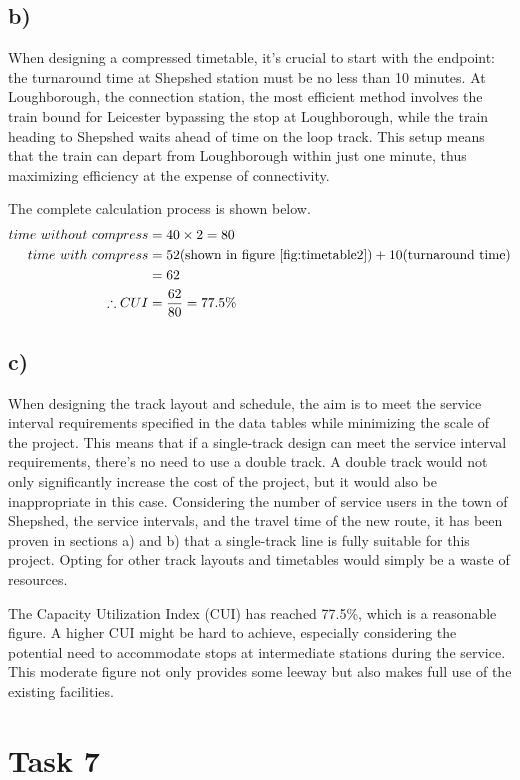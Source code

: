 \documentclass[letterpaper,12pt,leqno]{article}
\begin{document}
\subsection{b)}
When designing a compressed timetable, it's crucial to start with the endpoint: the turnaround time at Shepshed station must be no less than 10 minutes. At Loughborough, the connection station, the most efficient method involves the train bound for Leicester bypassing the stop at Loughborough, while the train heading to Shepshed waits ahead of time on the loop track. This setup means that the train can depart from Loughborough within just one minute, thus maximizing efficiency at the expense of connectivity.

The complete calculation process is shown below.
\begin{align}
time\ without\ compress&= 40 \times 2 = 80 \notag\\
time\ with\ compress&=52(\text{shown in figure \ref{fig:timetable2}})+10(\text{turnaround time})\notag\\
&=62 \notag \\
\therefore CUI &= \frac{62}{80} = 77.5 \notag \%
\end{align}

\subsection{c)}
When designing the track layout and schedule, the aim is to meet the service interval requirements specified in the data tables while minimizing the scale of the project. This means that if a single-track design can meet the service interval requirements, there's no need to use a double track. A double track would not only significantly increase the cost of the project, but it would also be inappropriate in this case. Considering the number of service users in the town of Shepshed, the service intervals, and the travel time of the new route, it has been proven in sections a) and b) that a single-track line is fully suitable for this project. Opting for other track layouts and timetables would simply be a waste of resources.

The Capacity Utilization Index (CUI) has reached 77.5\%, which is a reasonable figure. A higher CUI might be hard to achieve, especially considering the potential need to accommodate stops at intermediate stations during the service. This moderate figure not only provides some leeway but also makes full use of the existing facilities.
\section{Task 7}
\end{document}
